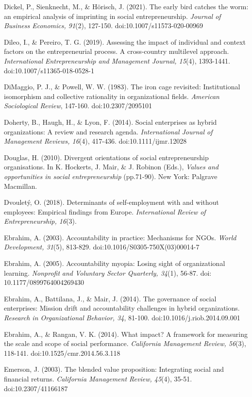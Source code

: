 \documentclass{article}
\begin{document}
Dickel, P., Sienknecht, M., \& Hörisch, J. (2021). The early bird catches the worm: an empirical analysis of imprinting in social entrepreneurship. \emph{Journal of Business Economics, 91}(2), 127-150. doi:10.1007/s11573-020-00969

Dileo, I., \& Pereiro, T. G. (2019). Assessing the impact of individual and context factors on the entrepreneurial process. A cross-country multilevel approach. \emph{International Entrepreneurship and Management Journal, 15}(4), 1393-1441. doi:10.1007/s11365-018-0528-1

DiMaggio, P. J., \& Powell, W. W. (1983). The iron cage revisited: Institutional isomorphism and collective rationality in organizational fields. \emph{American Sociological Review}, 147-160. doi:10.2307/2095101

Doherty, B., Haugh, H., \& Lyon, F. (2014). Social enterprises as hybrid organizations: A review and research agenda. \emph{International Journal of Management Reviews, 16}(4), 417-436. doi:10.1111/ijmr.12028

Douglas, H. (2010). Divergent orientations of social entrepreneurship organisations. In K. Hockerts, J. Mair, \& J. Robinon (Eds.), \emph{Values and opportunities in social entrepreneurship} (pp.71-90). New York: Palgrave Macmillan.

Dvouletý, O. (2018). Determinants of self-employment with and without employees: Empirical findings from Europe. \emph{International Review of Entrepreneurship, 16}(3). 

Ebrahim, A. (2003). Accountability in practice: Mechanisms for NGOs. \emph{World Development, 31}(5), 813-829. doi:10.1016/S0305-750X(03)00014-7

Ebrahim, A. (2005). Accountability myopia: Losing sight of organizational learning. \emph{Nonprofit}\emph{ and Voluntary Sector Quarterly, 34}(1), 56-87. doi: 10.1177/0899764004269430

Ebrahim, A., Battilana, J., \& Mair, J. (2014). The governance of social enterprises: Mission drift and accountability challenges in hybrid organizations. \emph{Research in Organizational }\emph{Behavior}\emph{, 34}, 81-100. doi:10.1016/j.riob.2014.09.001

Ebrahim, A., \& Rangan, V. K. (2014). What impact? A framework for measuring the scale and scope of social performance. \emph{California Management Review, 56}(3), 118-141. doi:10.1525/cmr.2014.56.3.118

Emerson, J. (2003). The blended value proposition: Integrating social and financial returns. \emph{California Management Review, 45}(4), 35-51. doi:10.2307/41166187
\end{document}
